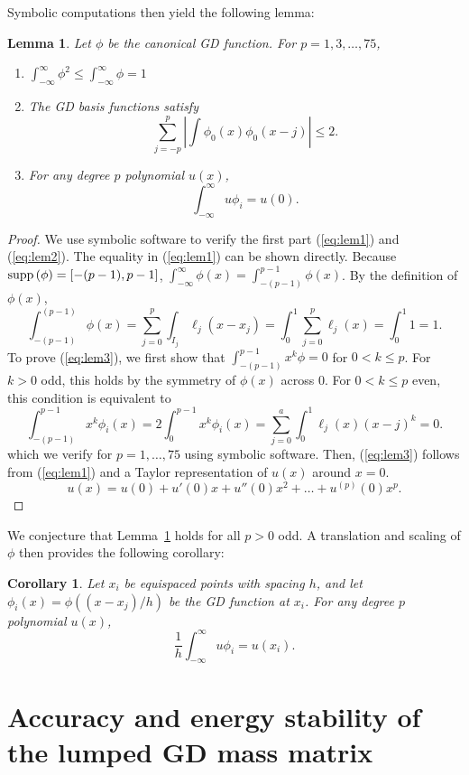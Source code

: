 \documentclass[preprint,10pt]{amsart}
\theoremstyle{lemma}
\newtheorem{lemma}{Lemma}
\theoremstyle{corollary}
\newtheorem{corollary}{Corollary}
\theoremstyle{theorem}
\newcommand{\LRp}[1]{\left( #1 \right)}
\newcommand{\LRb}[1]{\left| #1 \right|}
\begin{document}
Symbolic computations then yield the following lemma:
\begin{lemma}
Let $\phi$ be the canonical GD function.  For $p = 1,3,\ldots, 75$, 
\begin{enumerate}
\item $\int_{-\infty}^{\infty} \phi^2 \leq \int_{-\infty}^{\infty} \phi = 1$  \label{eq:lem1}
\item The GD basis functions satisfy \label{eq:lem2}
\[
\sum_{j=-p}^{p} \LRb{ \int \phi_0(x) \phi_0(x-j)} \leq 2.
\]
\item For any degree $p$ polynomial $u(x)$, \label{eq:lem3}
\[
\int_{-\infty}^{\infty} u\phi_i = u(0).
\]
\end{enumerate}
\label{lemma:gdprops}
\end{lemma}
\begin{proof}
We use symbolic software to verify the first part (\ref{eq:lem1}) and (\ref{eq:lem2}).  
The equality in (\ref{eq:lem1}) can be shown directly.  Because ${\rm supp}\LRp{\phi} = [-(p-1),p-1]$, $\int_{-\infty}^\infty \phi(x) = \int_{-(p-1)}^{p-1} \phi(x)$.  By the definition of $\phi(x)$, 
\[
\int_{-(p-1)}^{(p-1)} \phi(x) = \sum_{j=0}^p \int_{I_j} \ell_j(x-x_j) = \int_0^1 \sum_{j=0}^p \ell_j(x) = \int_0^1 1 = 1.
\]
To prove (\ref{eq:lem3}), we first show that $\int_{-(p-1)}^{p-1} x^k\phi = 0$ for $0 < k \leq p$.  For $k > 0$ odd, this holds by the symmetry of $\phi(x)$ across $0$.  For $0 < k \leq p$ even, this condition is equivalent to
\[
\int_{-(p-1)}^{p-1} x^k \phi_i(x) = 2 \int_{0}^{p-1} x^k \phi_i(x)= \sum_{j=0}^a \int_0^1 \ell_j(x) (x-j)^k = 0.
\]
which we verify for $p = 1,\ldots, 75$ using symbolic software.  
Then, (\ref{eq:lem3}) follows from (\ref{eq:lem1}) and a Taylor representation of $u(x)$ around $x = 0$.
\[
u(x) = u(0) + u'(0) x + u''(0) x^2 + \ldots + u^{(p)}(0) x^p.
\]
\end{proof}
We conjecture that Lemma~\ref{lemma:gdprops} holds for all $p > 0$ odd.  A translation and scaling of $\phi$ then provides the following corollary:
\begin{corollary}
Let $x_i$ be equispaced points with spacing $h$, and let $\phi_i(x) = \phi\LRp{(x - x_j)/h}$ be the GD function at $x_i$.  For any degree $p$ polynomial $u(x)$, 
\[
\frac{1}{h}\int_{-\infty}^{\infty} u\phi_i = u(x_i).
\]
\label{cor:acc}
\end{corollary}

\section{Accuracy and energy stability of the lumped GD mass matrix}
\end{document}
